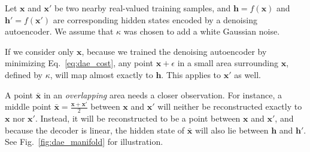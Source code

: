 \documentclass{now}
\newcommand{\vect}[1]{\mathbf{#1}}
\newcommand{\vh}[0]{\vect{h}}
\newcommand{\vx}[0]{\vect{x}}
\begin{document}
Let $\vx$ and $\vx'$ be two nearby real-valued training
samples, and $\vh=f(\vx)$ and $\vh'=f(\vx')$ are
corresponding hidden states encoded by a denoising
autoencoder. We assume that $\kappa$ was chosen to add a
white Gaussian noise.

If we consider only $\vx$, because we trained the denoising
autoencoder by minimizing Eq.~\eqref{eq:dae_cost}, any point
$\vx + \epsilon$ in a small area surrounding $\vx$, defined
by $\kappa$, will map almost exactly to $\vh$. This applies
to $\vx'$ as well. 

A point $\bar{\vx}$ in an \textit{overlapping} area needs a
closer observation.
For instance, a middle point
$\bar{\vx} = \frac{\vx + \vx'}{2}$ between $\vx$ and $\vx'$
will neither be reconstructed exactly to $\vx$ nor $\vx'$.
Instead, it will be reconstructed to be a point between
$\vx$ and $\vx'$, and because the decoder is linear, the
hidden state of $\bar{\vx}$ will also lie between $\vh$ and
$\vh'$. See Fig.~\ref{fig:dae_manifold} for illustration.
\end{document}
